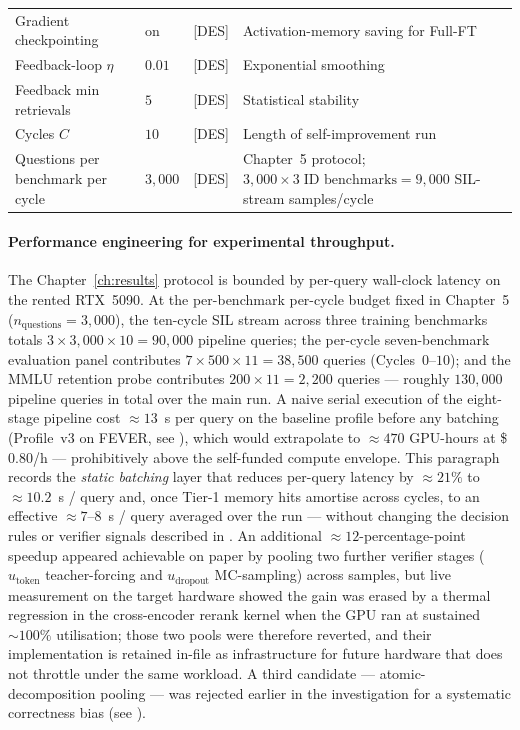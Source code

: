 \begin{table}[p]
\begin{tabular}{@{}p{4.6cm}p{1.5cm}p{0.9cm}p{4.8cm}@{}}
Gradient checkpointing & on & [DES] & Activation-memory saving for Full-FT \\
Feedback-loop $\eta$ & $0.01$ & [DES] & Exponential smoothing \\
Feedback min retrievals & $5$ & [DES] & Statistical stability \\
Cycles $C$ & $10$ & [DES] & Length of self-improvement run \\
Questions per benchmark per cycle & $3{,}000$ & [DES] & Chapter~5 protocol; $3{,}000 \times 3\;\text{ID benchmarks} = 9{,}000$ SIL-stream samples/cycle \\
\bottomrule
\end{tabular}
\end{table}

\paragraph{Performance engineering for experimental throughput.}
\label{par:perf-engineering}
The Chapter~\ref{ch:results} protocol is bounded by per-query wall-clock latency on the rented RTX~5090. At the per-benchmark per-cycle budget fixed in Chapter~5 ($n_{\text{questions}} = 3{,}000$), the ten-cycle SIL stream across three training benchmarks totals $3 \times 3{,}000 \times 10 = 90{,}000$ pipeline queries; the per-cycle seven-benchmark evaluation panel contributes $7 \times 500 \times 11 = 38{,}500$ queries (Cycles~$0$--$10$); and the MMLU retention probe contributes $200 \times 11 = 2{,}200$ queries --- roughly $130{,}000$ pipeline queries in total over the main run. A naive serial execution of the eight-stage pipeline cost $\approx 13$~s per query on the baseline profile before any batching (Profile~v3 on FEVER, see ), which would extrapolate to $\approx 470$ GPU-hours at \$$0.80$/h --- prohibitively above the self-funded compute envelope. This paragraph records the \emph{static batching} layer that reduces per-query latency by $\approx 21\%$ to $\approx 10.2$~s / query and, once Tier-1 memory hits amortise across cycles, to an effective $\approx 7$--$8$~s / query averaged over the run --- without changing the decision rules or verifier signals described in . An additional
$\approx 12$-percentage-point speedup appeared achievable on paper by
pooling two further verifier stages ($u_{\text{token}}$
teacher-forcing and $u_{\text{dropout}}$ MC-sampling) across samples,
but live measurement on the target hardware showed the gain was
erased by a thermal regression in the cross-encoder rerank kernel
when the GPU ran at sustained $\sim\!100\%$ utilisation; those two
pools were therefore reverted, and their implementation is retained
in-file as infrastructure for future hardware that does not throttle
under the same workload. A third candidate --- atomic-decomposition
pooling --- was rejected earlier in the investigation for a
systematic correctness bias (see
).


